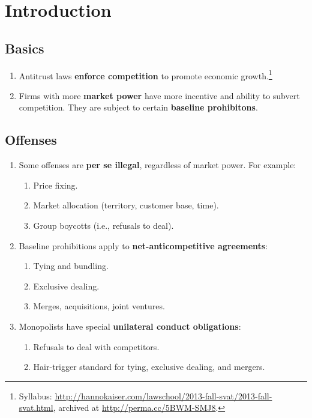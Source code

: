 \section{Introduction}

\subsection{Basics}

\begin{enumerate}
    \item Antitrust laws \textbf{enforce competition} to promote economic 
    growth.\footnote{Syllabus: 
    \url{http://hannokaiser.com/lawschool/2013-fall-svat/2013-fall-svat.html}, 
    archived at \url{http://perma.cc/5BWM-SMJ8}.}
    \item Firms with more \textbf{market power} have more incentive and ability 
    to subvert competition. They are subject to certain \textbf{baseline 
    prohibitons}.
\end{enumerate}

\subsection{Offenses}

\begin{enumerate}
    \item Some offenses are \textbf{per se illegal}, regardless of market power.  
    For example:
    \begin{enumerate}
        \item Price fixing.
        \item Market allocation (territory, customer base, time).
        \item Group boycotts (i.e., refusals to deal).
    \end{enumerate}
    \item Baseline prohibitions apply to \textbf{net-anticompetitive 
    agreements}:
    \begin{enumerate}
        \item Tying and bundling.
        \item Exclusive dealing.
        \item Merges, acquisitions, joint ventures.
    \end{enumerate}
    \item Monopolists have special \textbf{unilateral conduct obligations}:
    \begin{enumerate}
        \item Refusals to deal with competitors.
        \item Hair-trigger standard for tying, exclusive dealing, and mergers.
    \end{enumerate}
\end{enumerate}

